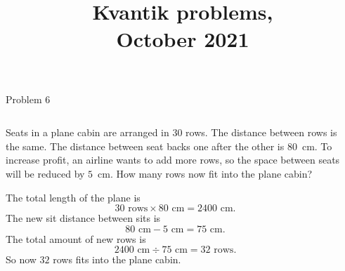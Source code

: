 \documentclass[9pt,aspectratio=169]{beamer}
\title{Kvantik problems,\\ October 2021}
\begin{document}
\maketitle

\begin{frame}{Problem 6}
  \begin{columns}[T]
    \begin{column}{0.5\textwidth}
      \begin{problem}
        Seats in a plane cabin are arranged in $30$ rows. The distance between rows is the same. The distance between seat backs one after the other is $80$~cm. To increase profit, an airline wants to add more rows, so the space between seats will be reduced by $5$~cm. How many rows now fit into the plane cabin?
      \end{problem}

      The total length of the plane is 
      \[ 30 \text{ rows} \times 80 \text{ cm} = 2400 \text{ cm}.\] 
      The new sit distance between sits is 
      \[ 80 \text{ cm} - 5 \text{ cm} = 75 \text{ cm}.\] 
      The total amount of new rows is 
      \[ 2400 \text{ cm} \div 75 \text{ cm} = 32 \text{ rows}. \]
      So now $32$ rows fits into the plane cabin.
    \end{column}
    \begin{column}{0.5\textwidth}
    \end{column}
  \end{columns}
\end{frame}
\end{document}
